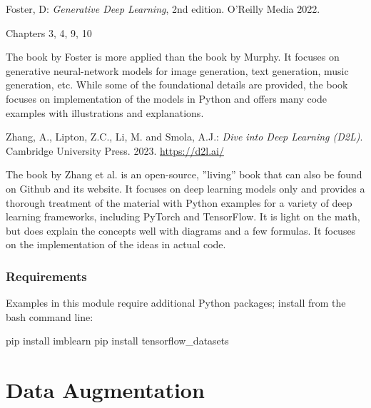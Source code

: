 \begin{withcode}
\begin{resourcebox}
Foster, D: \emph{Generative Deep Learning}, 2nd edition. O'Reilly Media 2022. \\

\vspace{0.5\baselineskip}

Chapters 3, 4, 9, 10
\end{resourcebox}

The book by Foster is more applied than the book by Murphy. It focuses on generative neural-network models for image generation, text generation, music generation, etc. While some of the foundational details are provided, the book focuses on implementation of the models in Python and offers many code examples with illustrations and explanations.

\begin{resourcebox}
Zhang, A., Lipton, Z.C., Li, M. and Smola, A.J.: \emph{Dive into Deep Learning (D2L)}. Cambridge University Press. 2023. \url{https://d2l.ai/} \\
\end{resourcebox}

The book by Zhang et al. is an open-source, ''living'' book that can also be found on Github and its website. It focuses on deep learning models only and provides a thorough treatment of the material with Python examples for a variety of deep learning frameworks, including PyTorch and TensorFlow. It is light on the math, but does explain the concepts well with diagrams and a few formulas. It focuses on the implementation of the ideas in actual code. 

\begin{infobox}
\subsubsection*{Requirements}

Examples in this module require additional Python packages; install from the bash command line:

\begin{bashcode}
pip install imblearn
pip install tensorflow_datasets
\end{bashcode}
\end{infobox}
\end{withcode}


\section{Data Augmentation}

